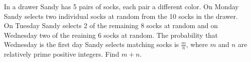 In a drawer Sandy has 5 pairs of socks, each pair a different color. On Monday Sandy selects two individual socks at random from the 10 socks in the drawer. On Tuesday Sandy selects 2 of the remaining 8 socks at random and on Wednesday two of the reaining 6 socks at random. The probability that Wednesday is the first day Sandy selects matching socks is $\tfrac{m}{n}$, where $m$ and $n$ are relatively prime positive integers. Find $m+n$.